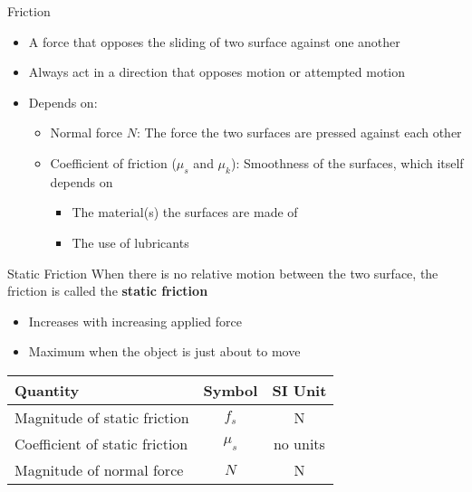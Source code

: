 \documentclass[12pt,compress,aspectratio=169]{beamer}
\begin{document}
\begin{frame}{Friction}
  \begin{itemize}
  \item A force that opposes the sliding of two surface against one another
  \item Always act in a direction that opposes motion or attempted motion
  \item Depends on:
    \begin{itemize}
    \item Normal force $N$: The force the two surfaces are pressed against
      each other
    \item Coefficient of friction ($\mu_s$ and $\mu_k$): Smoothness of the
      surfaces, which itself depends on
      \begin{itemize}
      \item The material(s) the surfaces are made of
      \item The use of lubricants
      \end{itemize}
    \end{itemize}
  \end{itemize}
  \begin{center}
    \vspace{-.1in}
  \end{center}
\end{frame}



\begin{frame}{Static Friction}
  When there is no relative motion between the two surface, the friction is
  called the \textbf{static friction}
  \begin{itemize}
  \item Increases with increasing applied force
  \item Maximum when the object is just about to move
  \end{itemize}

  \begin{center}
    \begin{tabular}{l|c|c}
      \rowcolor{pink}
      \textbf{Quantity} & \textbf{Symbol} & \textbf{SI Unit} \\ \hline
      Magnitude of static friction & $f_s$ & \si\newton \\
      Coefficient of static friction & $\mu_s$ & no units \\
      Magnitude of normal force    & $N$ & \si\newton
    \end{tabular}
  \end{center}
\end{frame}
\end{document}
